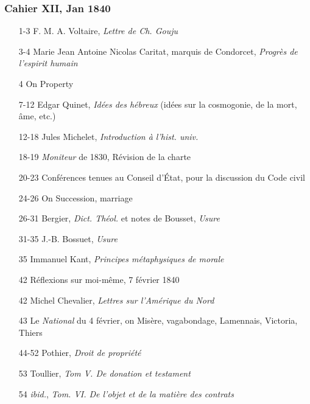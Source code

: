 \subsubsection*{Cahier XII, Jan 1840}
\begin{enumerate}
    \item[1-3] F. M. A. Voltaire, \textit{Lettre de Ch. Gouju}
    \item[3-4] Marie Jean Antoine Nicolas Caritat, marquis de Condorcet, \textit{Progrès de l'espirit humain}
    \item[4] On Property
    \item[7-12] Edgar Quinet, \textit{Idées des hébreux} (idées sur la cosmogonie, de la mort, âme, etc.)
    \item[12-18] Jules Michelet, \textit{Introduction à l'hist. univ.}
    \item[18-19] \textit{Moniteur} de 1830, Révision de la charte
	\item[20-23] Conférences tenues au Conseil d'État, pour la discussion du Code civil
	\item[24-26] On Succession, marriage
    \item[26-31] Bergier, \textit{Dict. Théol.} et notes de Bousset, \textit{Usure}
    \item[31-35] J.-B. Bossuet, \textit{Usure}
	\item[35] Immanuel Kant, \textit{Principes métaphysiques de morale}
    \item[42] Réflexions sur moi-même, 7 février 1840
    \item[42] Michel Chevalier, \textit{Lettres sur l'Amérique du Nord}
    \item[43] Le \textit{National} du 4 février, on Misère, vagabondage, Lamennais, Victoria, Thiers
    \item[44-52] Pothier, \textit{Droit de propriété}
    \item[53] Toullier, \textit{Tom V. De donation et testament}
    \item[54] \textit{ibid.}, \textit{Tom. VI. De l'objet et de la matière des contrats}
    \end{enumerate}
